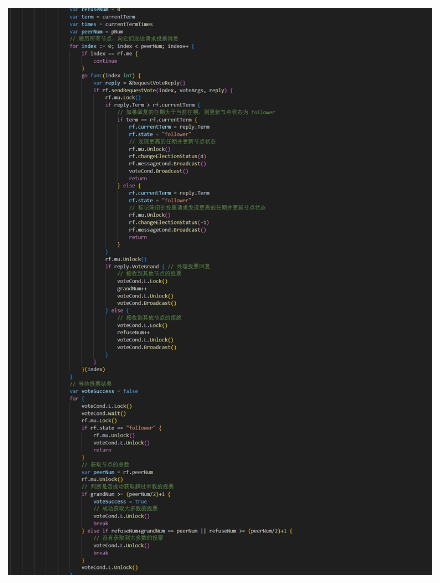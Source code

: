 \documentclass[]{article}
\begin{document}
\begin{itemize}
\begin{figure}[H]
			\includegraphics[height=1\textheight]{./2B/ticker2.png}
		\end{figure}
		\begin{figure}[H]
			\centering

\end{figure}
\end{itemize}
\end{document}
